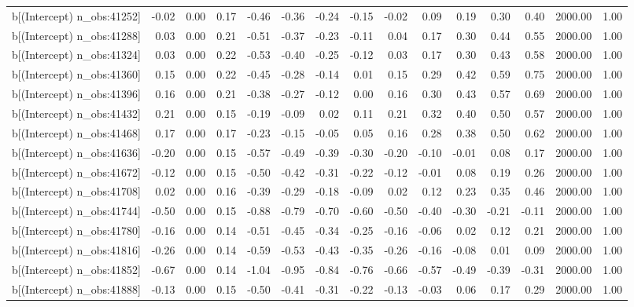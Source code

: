 \begin{table}[ht]
\begin{tabular}{rrrrrrrrrrrrrrr}
  b[(Intercept) n\_obs:41252] & -0.02 & 0.00 & 0.17 & -0.46 & -0.36 & -0.24 & -0.15 & -0.02 & 0.09 & 0.19 & 0.30 & 0.40 & 2000.00 & 1.00 \\ 
  b[(Intercept) n\_obs:41288] & 0.03 & 0.00 & 0.21 & -0.51 & -0.37 & -0.23 & -0.11 & 0.04 & 0.17 & 0.30 & 0.44 & 0.55 & 2000.00 & 1.00 \\ 
  b[(Intercept) n\_obs:41324] & 0.03 & 0.00 & 0.22 & -0.53 & -0.40 & -0.25 & -0.12 & 0.03 & 0.17 & 0.30 & 0.43 & 0.58 & 2000.00 & 1.00 \\ 
  b[(Intercept) n\_obs:41360] & 0.15 & 0.00 & 0.22 & -0.45 & -0.28 & -0.14 & 0.01 & 0.15 & 0.29 & 0.42 & 0.59 & 0.75 & 2000.00 & 1.00 \\ 
  b[(Intercept) n\_obs:41396] & 0.16 & 0.00 & 0.21 & -0.38 & -0.27 & -0.12 & 0.00 & 0.16 & 0.30 & 0.43 & 0.57 & 0.69 & 2000.00 & 1.00 \\ 
  b[(Intercept) n\_obs:41432] & 0.21 & 0.00 & 0.15 & -0.19 & -0.09 & 0.02 & 0.11 & 0.21 & 0.32 & 0.40 & 0.50 & 0.57 & 2000.00 & 1.00 \\ 
  b[(Intercept) n\_obs:41468] & 0.17 & 0.00 & 0.17 & -0.23 & -0.15 & -0.05 & 0.05 & 0.16 & 0.28 & 0.38 & 0.50 & 0.62 & 2000.00 & 1.00 \\ 
  b[(Intercept) n\_obs:41636] & -0.20 & 0.00 & 0.15 & -0.57 & -0.49 & -0.39 & -0.30 & -0.20 & -0.10 & -0.01 & 0.08 & 0.17 & 2000.00 & 1.00 \\ 
  b[(Intercept) n\_obs:41672] & -0.12 & 0.00 & 0.15 & -0.50 & -0.42 & -0.31 & -0.22 & -0.12 & -0.01 & 0.08 & 0.19 & 0.26 & 2000.00 & 1.00 \\ 
  b[(Intercept) n\_obs:41708] & 0.02 & 0.00 & 0.16 & -0.39 & -0.29 & -0.18 & -0.09 & 0.02 & 0.12 & 0.23 & 0.35 & 0.46 & 2000.00 & 1.00 \\ 
  b[(Intercept) n\_obs:41744] & -0.50 & 0.00 & 0.15 & -0.88 & -0.79 & -0.70 & -0.60 & -0.50 & -0.40 & -0.30 & -0.21 & -0.11 & 2000.00 & 1.00 \\ 
  b[(Intercept) n\_obs:41780] & -0.16 & 0.00 & 0.14 & -0.51 & -0.45 & -0.34 & -0.25 & -0.16 & -0.06 & 0.02 & 0.12 & 0.21 & 2000.00 & 1.00 \\ 
  b[(Intercept) n\_obs:41816] & -0.26 & 0.00 & 0.14 & -0.59 & -0.53 & -0.43 & -0.35 & -0.26 & -0.16 & -0.08 & 0.01 & 0.09 & 2000.00 & 1.00 \\ 
  b[(Intercept) n\_obs:41852] & -0.67 & 0.00 & 0.14 & -1.04 & -0.95 & -0.84 & -0.76 & -0.66 & -0.57 & -0.49 & -0.39 & -0.31 & 2000.00 & 1.00 \\ 
  b[(Intercept) n\_obs:41888] & -0.13 & 0.00 & 0.15 & -0.50 & -0.41 & -0.31 & -0.22 & -0.13 & -0.03 & 0.06 & 0.17 & 0.29 & 2000.00 & 1.00 \\ 

\end{tabular}
\end{table}
